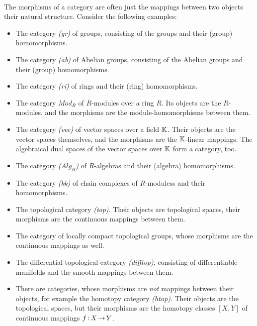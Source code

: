 \documentclass[11pt,twoside]{article}
\begin{document}
\paragraph{}
The morphisms of a category are often
just the mappings between two objects {\wrt} their natural structure.
Consider the following examples:

\begin{itemize}[leftmargin=22pt]
\item[1.]
The category \textit{(gr)} of groups, 
consisting of the groups and their (group) homomorphisms.

\item[2.]
The category \textit{(ab)} of Abelian groups, 
consisting of the Abelian groups and their (group) homomorphisms.

\item[3.]
The category \textit{(ri)} of rings and their (ring) homomorphisms.

\item[4.]
The category \textit{$Mod_R$} of $R$-modules over a ring $R$.
Its objects are the $R$-modules,
and the morphisms are the module-homomorphisms between them.

\item[5.]
The category \textit{(vec)} of vector spaces over a field ${\mathbb{K}}$.
Their objects are the vector spaces themselves,
and the morphisms are the ${\mathbb{K}}$-linear mappings.
The algebraical dual spaces of the vector spaces over ${\mathbb{K}}$ form a  category,
too.

\item[6.]
The category \textit{($Alg_R$)} of $R$-algebras and their (algebra) homomorphisms.

\item[7.]
The category \textit{(kk)} of chain complexes of $R$-moduless
and their homomorphisms.

\item[8.]
The topological category \textit{(top)}.
Their objects are topological spaces,
their morphisms are the continuous mappings between them.

\item[9.]
The category of locally compact topological groups,
whose morphisms are the continuous mappings as well.

\item[10.]
The differential-topological category \textit{(difftop)},
consisting of differentiable manifolds
and the smooth mappings between them.

\item[11.]
There are categories,
whose morphisms are \textit{not} mappings between their objects,
for example the homotopy category \textit{(htop)}. 
Their objects are the topological spaces,
but their morphisms are the homotopy classes $[X,Y]$ of continuous mappings
$f {\,:\,} X {\,\to\,} Y$.
\end{itemize}
\end{document}
